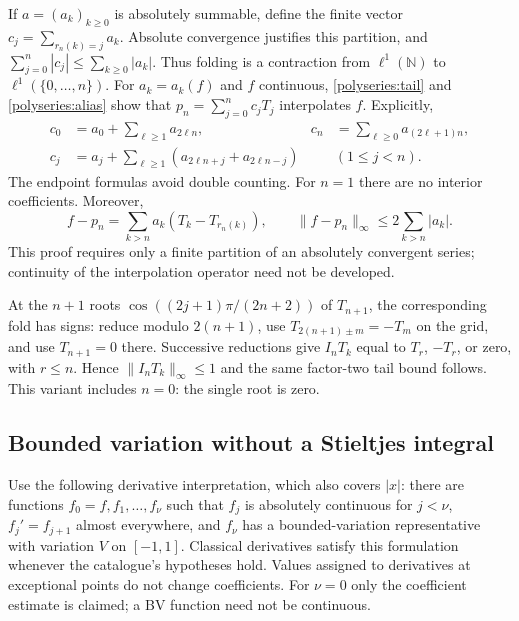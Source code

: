 \documentclass[11pt]{article}
\theoremstyle{remark}
\numberwithin{equation}{section}
\begin{document}
If $a=(a_k)_{k\ge0}$ is absolutely summable, define the finite vector
$c_j=\sum_{r_n(k)=j}a_k$. Absolute convergence justifies this partition,
and $\sum_{j=0}^n|c_j|\le\sum_{k\ge0}|a_k|$. Thus folding is a
contraction from $\ell^1(\mathbb N)$ to $\ell^1(\{0,\ldots,n\})$.
For $a_k=a_k(f)$ and $f$ continuous, \eqref{polyseries:tail} and
\eqref{polyseries:alias} show that
$p_n=\sum_{j=0}^nc_jT_j$ interpolates $f$. Explicitly,
\begin{align*}
 c_0&=a_0+\sum_{\ell\ge1}a_{2\ell n},&
 c_n&=\sum_{\ell\ge0}a_{(2\ell+1)n},\\
 c_j&=a_j+\sum_{\ell\ge1}(a_{2\ell n+j}+a_{2\ell n-j})
 &&(1\le j<n).
\end{align*}
The endpoint formulas avoid double counting. For $n=1$ there are no
interior coefficients. Moreover,
\begin{equation}\label{polyseries:aliaserror}
 f-p_n=\sum_{k>n}a_k(T_k-T_{r_n(k)}),\qquad
 \|f-p_n\|_\infty\le2\sum_{k>n}|a_k|.
\end{equation}
This proof requires only a finite partition of an absolutely convergent
series; continuity of the interpolation operator need not be developed.

At the $n+1$ roots $\cos((2j+1)\pi/(2n+2))$ of $T_{n+1}$, the
corresponding fold has signs: reduce modulo $2(n+1)$, use
$T_{2(n+1)\pm m}=-T_m$ on the grid, and use $T_{n+1}=0$ there.
Successive reductions give $I_nT_k$ equal to $T_r$, $-T_r$, or zero,
with $r\le n$. Hence $\|I_nT_k\|_\infty\le1$ and the same factor-two
tail bound follows. This variant includes $n=0$: the single root is zero.

\subsection{Bounded variation without a Stieltjes integral}
\label{polyseries:bv}
Use the following derivative interpretation, which also covers $|x|$:
there are functions $f_0=f,f_1,\ldots,f_\nu$ such that $f_j$ is absolutely
continuous for $j<\nu$, $f_j'=f_{j+1}$ almost everywhere, and $f_\nu$ has
a bounded-variation representative with variation $V$ on $[-1,1]$.
Classical derivatives satisfy this formulation whenever the catalogue's
hypotheses hold. Values assigned to derivatives at exceptional points
do not change coefficients. For $\nu=0$ only the coefficient estimate is
claimed; a BV function need not be continuous.
\end{document}
